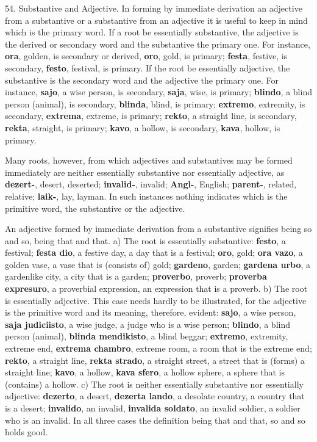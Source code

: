 54. Substantive and Adjective. In forming by immediate derivation an adjective from a substantive or a substantive from an adjective it is useful to keep in mind which is the primary word. If a root be essentially substantive, the adjective is the derived or secondary word and the substantive the primary one. For instance, \textbf{ora}, golden, is secondary or derived, \textbf{oro}, gold, is primary; \textbf{festa}, festive, is secondary, \textbf{festo}, festival, is primary. If the root be essentially adjective, the substantive is the secondary word and the adjective the primary one. For instance, \textbf{sajo}, a wise person, is secondary, \textbf{saja}, wise, is primary; \textbf{blindo}, a blind person (animal), is secondary, \textbf{blinda}, blind, is primary; \textbf{extremo}, extremity, is secondary, \textbf{extrema}, extreme, is primary; \textbf{rekto}, a straight line, is secondary, \textbf{rekta}, straight, is primary; \textbf{kavo}, a hollow, is secondary, \textbf{kava}, hollow, is primary. 

Many roots, however, from which adjectives and substantives may be formed immediately are neither essentially substantive nor essentially adjective, as \textbf{dezert-}, desert, deserted; \textbf{invalid-}, invalid; \textbf{Angl-}, English; \textbf{parent-}, related, relative; \textbf{laik-}, lay, layman. In such instances nothing indicates which is the primitive word, the substantive or the adjective. 

An adjective formed by immediate derivation from a substantive signifies being so and so, being that and that. a) The root is essentially substantive: \textbf{festo}, a festival; \textbf{festa dio}, a festive day, a day that is a festival; \textbf{oro}, gold; \textbf{ora vazo}, a golden vase, a vase that is (consists of) gold; \textbf{gardeno}, garden; \textbf{gardena urbo}, a gardenlike city, a city that is a garden; \textbf{proverbo}, proverb; \textbf{proverba expresuro}, a proverbial expression, an expression that is a proverb. b) The root is essentially adjective. This case needs hardly to be illustrated, for the adjective is the primitive word and its meaning, therefore, evident: \textbf{sajo}, a wise person, \textbf{saja judiciisto}, a wise judge, a judge who is a wise person; \textbf{blindo}, a blind person (animal), \textbf{blinda mendikisto}, a blind beggar; \textbf{extremo}, extremity, extreme end, \textbf{extrema chambro}, extreme room, a room that is the extreme end; \textbf{rekto}, a straight line, \textbf{rekta strado}, a straight street, a street that is (forms) a straight line; \textbf{kavo}, a hollow, \textbf{kava sfero}, a hollow sphere, a sphere that is (contains) a hollow. c) The root is neither essentially substantive nor essentially adjective: \textbf{dezerto}, a desert, \textbf{dezerta lando}, a desolate country, a country that is a desert; \textbf{invalido}, an invalid, \textbf{invalida soldato}, an invalid soldier, a soldier who is an invalid. In all three cases the definition being that and that, so and so holds good. 

